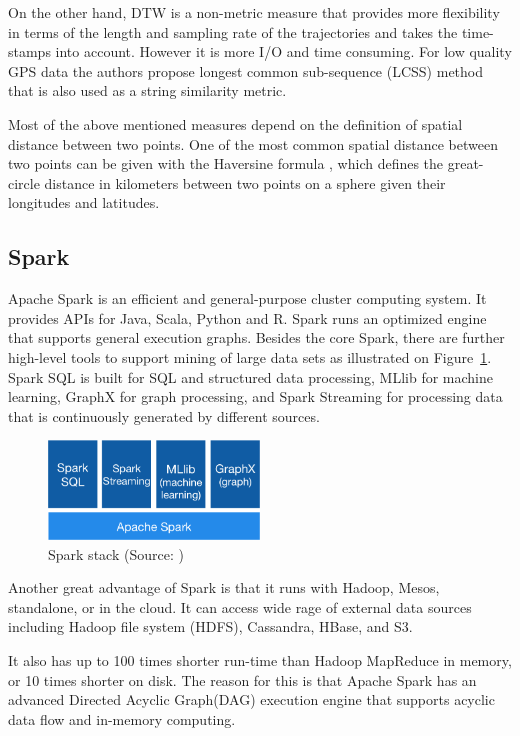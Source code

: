 On the other hand, DTW is a non-metric measure that provides more flexibility in terms of the length and sampling rate of the trajectories and takes the time-stamps into account. However it is more I/O and time consuming. For low quality GPS data the authors propose longest common sub-sequence (LCSS) method that is also used as a string similarity metric.

Most of the above mentioned measures depend on the definition of spatial distance between two points. One of the most common spatial distance between two points can be given with the Haversine formula \cite{haversine}, which  defines the great-circle distance in kilometers between two points on a sphere given their longitudes and latitudes.

\subsection{Spark}
Apache Spark is an efficient and general-purpose cluster computing system. It provides APIs for Java, Scala, Python and R. Spark runs an optimized engine that supports general execution graphs. Besides the core Spark, there are further high-level tools to support mining of large data sets as illustrated on Figure~\ref{fig:spark}. Spark SQL is built for SQL and structured data processing, MLlib for machine learning, GraphX for graph processing, and Spark Streaming for processing data that is continuously generated by different sources.
\begin{figure}[h]
    \centering
    \includegraphics[width=0.5\textwidth]{images/spark-stack}
    \caption{Spark stack (Source: \cite{spark})}
    \label{fig:spark}
\end{figure}

Another great advantage of Spark is that it runs with Hadoop, Mesos, standalone, or in the cloud. It can access wide rage of external data sources including Hadoop file system (HDFS), Cassandra, HBase, and S3. 

It also has up to 100 times shorter run-time than Hadoop MapReduce in memory, or 10 times shorter on disk. The reason for this is that Apache Spark has an advanced Directed Acyclic Graph(DAG) execution engine that supports acyclic data flow and in-memory computing.\cite{spark}

